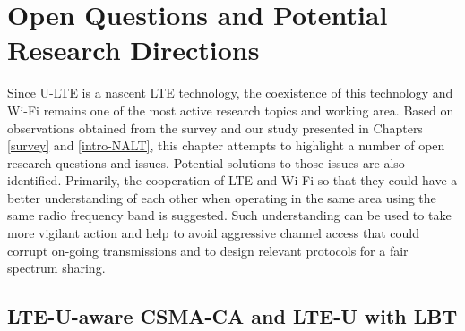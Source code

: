 %
%
%
\chapter{Open Questions and Potential Research Directions}
\label{open-research} %


Since U-LTE is a nascent LTE technology, the coexistence of this technology and Wi-Fi remains one of the most active research topics and working area. Based on observations obtained from the survey and our study presented in Chapters \ref{survey} and \ref{intro-NALT}, this chapter attempts to highlight a number of open research questions and issues. Potential solutions to those issues are also identified. Primarily, the cooperation of LTE and Wi-Fi so that they could have a better understanding of each other when operating in the same area using the same radio frequency band is suggested. Such understanding can be used to take more vigilant action and help to avoid aggressive channel access that could corrupt on-going transmissions and to design relevant protocols for a fair spectrum sharing.

\section{LTE-U-aware CSMA-CA and LTE-U with LBT}
\label{subsection:LTE-U-aware}

